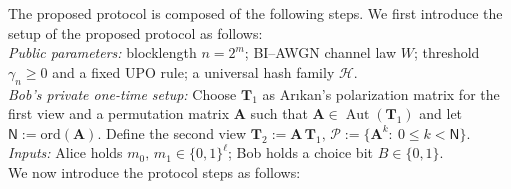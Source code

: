 \documentclass[onecolumn]{IEEEtran} %
\newcommand{\bA}{\mathbf A}
\newcommand{\1}{\mathbbm{1}}
\DeclareMathOperator{\Aut}{Aut}
\theoremstyle{boldremark}
\newcommand{\bT}{\mathbf{T}}
\begin{document}
The proposed protocol is composed of the following steps. We first introduce the setup of the proposed protocol as follows:\\
\textit{Public parameters:}
blocklength $n=2^m$; BI--AWGN channel law $W$; threshold $\gamma_n\geq 0$ and a fixed UPO rule;
a universal hash family $\mathcal{H}$.\\
\textit{Bob's private one-time setup:}
Choose $\bT_1$ as Ar{\i}kan's polarization matrix for the first view and a permutation matrix $\bA$ such that
$\bA \in \Aut(\bT_1)$
and let $\textsf{N}:=\mbox{ord}(\bA)$.
Define the second view $\bT_2 := \bA\,\bT_1,  \,  \mathcal{P} := \{\bA^k:\ 0\le k<\textsf{N}\}.$\\
\textit{Inputs:} Alice holds $m_0,\,m_1\in \{0,1\}^{\ell}$; Bob holds a choice bit $B\in\{0,1\}$.\\
We now introduce the protocol steps as follows:
\end{document}
